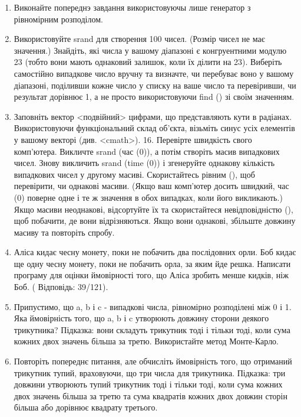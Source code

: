 \documentclass[]{article}
\begin{document}
\begin{enumerate}
\item Виконайте попереднэ завдання використовуючы лише генератор з рівномірним розподілом.

\item
Використовуйте srand для створення 100 чисел. (Розмір чисел не має
значення.) Знайдіть, які числа у вашому діапазоні є конгруентними модулю
23 (тобто вони мають однаковий залишок, коли їх ділити на 23). Виберіть
самостійно випадкове число вручну та визначте, чи перебуває воно у
вашому діапазоні, поділивши кожне число у списку на ваше число та
перевіривши, чи результат дорівнює 1, а не просто використовуючи find ()
зі своїм значенням. 

\item
 Заповніть вектор \textless{}подвійний\textgreater{} цифрами, що представляють кути в
радіанах. Використовуючи функціональний склад об'єкта, візьміть синус
усіх елементів у вашому векторі (див. \textless{}cmath\textgreater{}).
16. Перевірте швидкість свого комп'ютера. Викличте srand (час (0)), а
потім створіть масив випадкових чисел. Знову викличить srand (time (0))
і згенеруйте однакову кількість випадкових чисел у другому масиві.
Скористайтесь рівним (), щоб перевірити, чи однакові масиви. (Якщо ваш
комп'ютер досить швидкий, час (0) поверне одне і те ж значення в обох
випадках, коли його викликають.) Якщо масиви неоднакові, відсортуйте їх
та скористайтеся невідповідністю (), щоб побачити, де вони
відрізняються. Якщо вони однакові, збільште довжину масиву та повторіть
спробу.


 \item Аліса кидає чесну монету, поки не побачить два послідовних орли.
Боб кидає ще одну чесну монету, поки не побачить орла, за яким йде решка.
Написати програму для оцінки ймовірності того, що Аліса зробить менше кидків, ніж Боб.
( Відповідь: 39/121).
\item
 Припустимо, що a, b і c - випадкові числа, рівномірно розподілені між 0 і 1.
 Яка ймовірність того, що a, b і c утворюють довжину сторони деякого трикутника?
Підказка: вони складуть трикутник тоді і тільки тоді, коли сума кожних двох значень більша за третю. Використайте метод Монте-Карло.

\item Повторіть попереднє питання, але обчисліть ймовірність того, що отриманий трикутник тупий, враховуючи, що три числа для трикутника.
Підказка: три довжини утворюють тупий трикутник тоді і тільки тоді, коли сума кожних двох значень більша за третю та сума квадратів кожних двох довжин сторін більша або дорівнює квадрату третього.


\end{enumerate}
\end{document}
